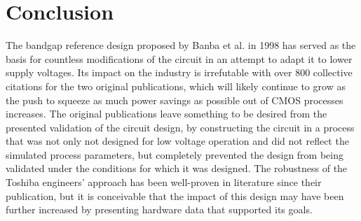 \documentclass[journal]{IEEEtran}
\begin{document}
\section{Conclusion}

The bandgap reference design proposed by Banba et al. in 1998 has served as the basis for countless modifications of the circuit in an attempt to adapt it to lower supply voltages. Its impact on the industry is irrefutable with over 800 collective citations for the two original publications, which will likely continue to grow as the push to squeeze as much power savings as possible out of CMOS processes increases. The original publications leave something to be desired from the presented validation of the circuit design, by constructing the circuit in a process that was not only not designed for low voltage operation and did not reflect the simulated process parameters, but completely prevented the design from being validated under the conditions for which it was designed. The robustness of the Toshiba engineers' approach has been well-proven in literature since their publication, but it is conceivable that the impact of this design may have been further increased by presenting hardware data that supported its goals.




%
%

\end{document}
